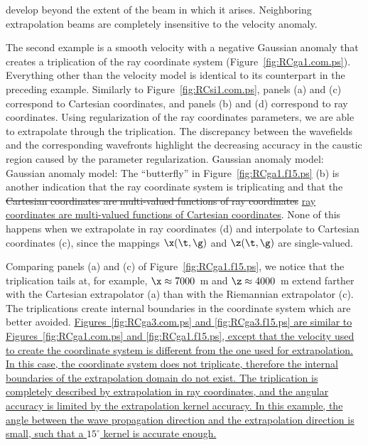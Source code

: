 develop beyond the extent of the beam
in which it arises. Neighboring extrapolation 
beams are completely insensitive to the 
velocity anomaly. 
\par
The second example is a smooth velocity 
with a negative Gaussian anomaly that creates
a triplication of the ray coordinate system
(Figure~\ref{fig:RCga1.com.ps}).
Everything other than the velocity model is 
identical to its counterpart in the preceding 
example.
Similarly to Figure~\ref{fig:RCsi1.com.ps},
panels (a) and (c) correspond to Cartesian 
coordinates, and panels (b) and (d) correspond
to ray coordinates. Using regularization of the
ray coordinates parameters, we are able to 
extrapolate through the triplication. 
The discrepancy between the wavefields and
the corresponding wavefronts highlight
the decreasing accuracy in the caustic region
caused by the parameter regularization.
{Gaussian anomaly model: }
{Gaussian anomaly model: }
The ``butterfly'' in Figure~\ref{fig:RCga1.f15.ps} (b) 
is another indication that the ray coordinate system
is triplicating and that the 
\sout{Cartesian coordinates are multi-valued 
functions of ray coordinates}
\uline{
ray coordinates are multi-valued functions 
of Cartesian coordinates}.
None of this happens when
we extrapolate in ray coordinates (d) and 
interpolate to Cartesian coordinates (c),
since the mappings $\x(\t,\g)$ and 
$\z(\t,\g)$ are single-valued.
\par
Comparing panels (a) and (c) of Figure~\ref{fig:RCga1.f15.ps},
we notice that the triplication tails at, for example,
$\x\approx7000$~m and $\z\approx4000$~m extend farther
with the Cartesian extrapolator (a) than with the 
Riemannian extrapolator (c). 
The triplications create internal boundaries in the coordinate
system which are better avoided.
\uline{
Figures~\ref{fig:RCga3.com.ps} and \ref{fig:RCga3.f15.ps} are 
similar to
Figures~\ref{fig:RCga1.com.ps} and \ref{fig:RCga1.f15.ps},
except that the velocity used to create the coordinate system
is different from the one used for extrapolation.
In this case, the coordinate system does not triplicate,
therefore the internal boundaries of the extrapolation domain
do not exist.
The triplication is completely described by extrapolation
in ray coordinates, and the angular accuracy is limited
by the extrapolation kernel accuracy. In this example,
the angle between the wave propagation direction 
and the extrapolation direction is small, such that
a $15^\circ$ kernel is accurate enough.
}
